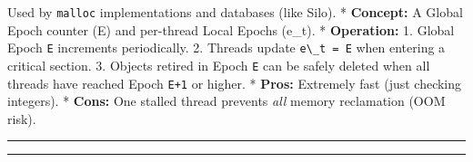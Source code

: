 Used by \passthrough{\lstinline!malloc!} implementations and databases
(like Silo). * \textbf{Concept:} A Global Epoch counter (E) and
per-thread Local Epochs (e\_t). * \textbf{Operation:} 1. Global Epoch
\passthrough{\lstinline!E!} increments periodically. 2. Threads update
\passthrough{\lstinline!e\_t = E!} when entering a critical section. 3.
Objects retired in Epoch \passthrough{\lstinline!E!} can be safely
deleted when all threads have reached Epoch
\passthrough{\lstinline!E+1!} or higher. * \textbf{Pros:} Extremely fast
(just checking integers). * \textbf{Cons:} One stalled thread prevents
\emph{all} memory reclamation (OOM risk).

\begin{center}\rule{0.5\linewidth}{0.5pt}\end{center}

\begin{center}\rule{0.5\linewidth}{0.5pt}\end{center}
